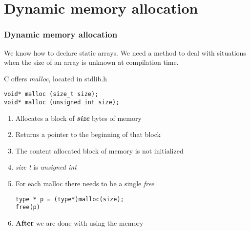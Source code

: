 \documentclass[10pt]{beamer}
\begin{document}
\section{Dynamic memory allocation}

\begin{frame}[fragile]
  \frametitle{Dynamic memory allocation}
\centering
We know how to declare static arrays. We need a method to deal with situations when the size of an array is unknown at compilation time.

C offers \textit{malloc}, located in stdlib.h

\begin{lstlisting}
void* malloc (size_t size);
void* malloc (unsigned int size);
\end{lstlisting}

\begin{enumerate}
	\item Allocates a block of \textbf{\textit{size}} bytes of memory
	\item Returns a pointer to the beginning of that block
	\item The content allocated block of memory is not initialized
	\item \textit{size t} is \textit{unsigned int}
	\item For each malloc there needs to be a single \textit{free}
\begin{lstlisting}
type * p = (type*)malloc(size);
free(p)
\end{lstlisting}
	\item \textbf{After} we are done with using the memory

\end{enumerate}


\end{frame}
\end{document}
